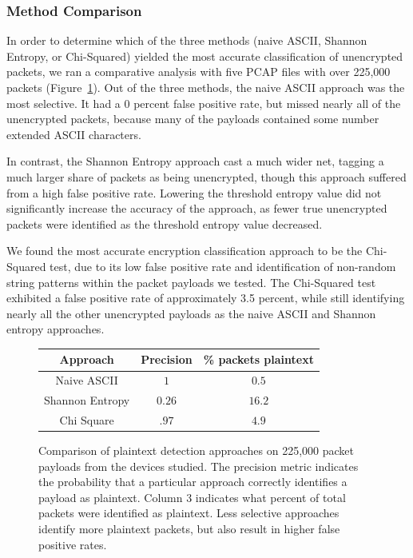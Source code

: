 \subsubsection{Method Comparison}
In order to determine which of the three methods (naive ASCII, Shannon Entropy, or Chi-Squared) yielded the most accurate classification of unencrypted packets, we ran a comparative analysis with five PCAP files with over 225,000 packets (Figure~\ref{fig:method-comp}). Out of the three methods, the naive ASCII approach was the most selective. It had a 0 percent false positive rate, but missed nearly all of the unencrypted packets, because many of the payloads contained some number extended ASCII characters. 

In contrast, the Shannon Entropy approach cast a much wider net, tagging a much larger share of packets as being unencrypted, though this approach suffered from a high false positive rate. Lowering the threshold entropy value did not significantly increase the accuracy of the approach, as fewer true unencrypted packets were identified as the threshold entropy value decreased. 

We found the most accurate encryption classification approach to be the Chi-Squared test, due to its low false positive rate and identification of non-random string patterns within the packet payloads we tested. The Chi-Squared test exhibited a false positive rate of approximately 3.5 percent, while still identifying nearly all the other unencrypted payloads as the naive ASCII and Shannon entropy approaches.


\begin{figure}
  \begin{center}
    \begin{tabular}{c|c|c} 
    \textbf{Approach} & \textbf{Precision} & \textbf{\% packets plaintext}\\ [0.5ex] 
    \hline
    Naive ASCII & $1$ & $0.5$ \\ 
    Shannon Entropy &  $0.26$ & $16.2$ \\
    Chi Square & $.97$ & $4.9$ \\
    \end{tabular}
    \caption{Comparison of plaintext detection approaches on 225,000 packet payloads from the devices studied. The precision metric indicates the probability that a particular approach correctly identifies a payload as plaintext. Column 3 indicates what percent of total packets were identified as plaintext. Less selective approaches identify more plaintext packets, but also result in higher false positive rates.}
    \label{fig:method-comp}
  \end{center}
\end{figure}

